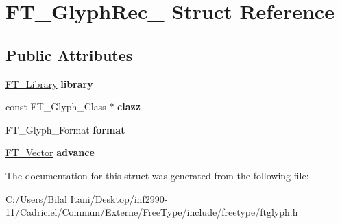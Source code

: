 \hypertarget{struct_f_t___glyph_rec__}{}\section{F\+T\+\_\+\+Glyph\+Rec\+\_\+ Struct Reference}
\label{struct_f_t___glyph_rec__}
\subsection*{Public Attributes}
\begin{DoxyCompactItemize}
\item 
\hyperlink{struct_f_t___library_rec__}{F\+T\+\_\+\+Library} {\bfseries library}\hypertarget{struct_f_t___glyph_rec___a00679b5e2519affab0f3999718817f8e}{}\label{struct_f_t___glyph_rec___a00679b5e2519affab0f3999718817f8e}

\item 
const F\+T\+\_\+\+Glyph\+\_\+\+Class $\ast$ {\bfseries clazz}\hypertarget{struct_f_t___glyph_rec___ad7074cfe0e9fd6616e4dc4011e481524}{}\label{struct_f_t___glyph_rec___ad7074cfe0e9fd6616e4dc4011e481524}

\item 
F\+T\+\_\+\+Glyph\+\_\+\+Format {\bfseries format}\hypertarget{struct_f_t___glyph_rec___a26b42a2610a69dcaed3e7c8b6d506211}{}\label{struct_f_t___glyph_rec___a26b42a2610a69dcaed3e7c8b6d506211}

\item 
\hyperlink{struct_f_t___vector__}{F\+T\+\_\+\+Vector} {\bfseries advance}\hypertarget{struct_f_t___glyph_rec___afd95b047df6a249db79018a279137018}{}\label{struct_f_t___glyph_rec___afd95b047df6a249db79018a279137018}

\end{DoxyCompactItemize}


The documentation for this struct was generated from the following file\+:\begin{DoxyCompactItemize}
\item 
C\+:/\+Users/\+Bilal Itani/\+Desktop/inf2990-\/11/\+Cadriciel/\+Commun/\+Externe/\+Free\+Type/include/freetype/ftglyph.\+h\end{DoxyCompactItemize}
